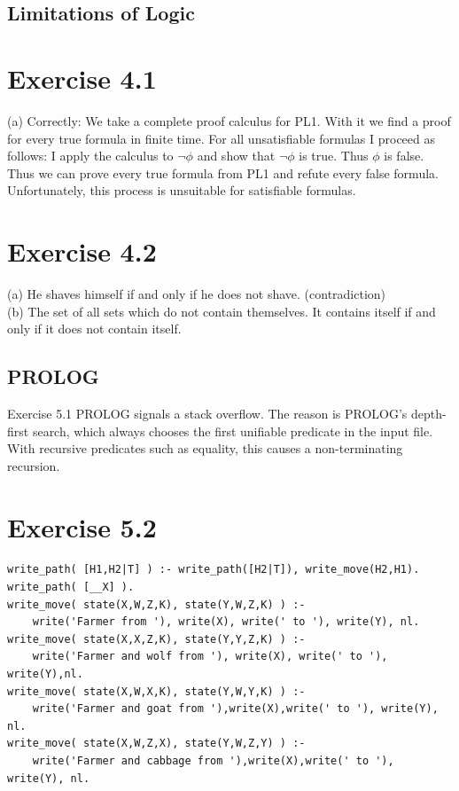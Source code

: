 \documentclass[10pt]{article}
\begin{document}
\subsection*{Limitations of Logic}
\section*{Exercise 4.1}
(a) Correctly: We take a complete proof calculus for PL1. With it we find a proof for every true formula in finite time. For all unsatisfiable formulas I proceed as follows: I apply the calculus to $\neg \phi$ and show that $\neg \phi$ is true. Thus $\phi$ is false. Thus we can prove every true formula from PL1 and refute every false formula. Unfortunately, this process is unsuitable for satisfiable formulas.

\section*{Exercise 4.2}
(a) He shaves himself if and only if he does not shave. (contradiction)\\
(b) The set of all sets which do not contain themselves. It contains itself if and only if it does not contain itself.

\subsection*{PROLOG}
Exercise 5.1 PROLOG signals a stack overflow. The reason is PROLOG's depth-first search, which always chooses the first unifiable predicate in the input file. With recursive predicates such as equality, this causes a non-terminating recursion.

\section*{Exercise 5.2}
\begin{verbatim}
write_path( [H1,H2|T] ) :- write_path([H2|T]), write_move(H2,H1).
write_path( [__X] ).
write_move( state(X,W,Z,K), state(Y,W,Z,K) ) :-
    write('Farmer from '), write(X), write(' to '), write(Y), nl.
write_move( state(X,X,Z,K), state(Y,Y,Z,K) ) :-
    write('Farmer and wolf from '), write(X), write(' to '), write(Y),nl.
write_move( state(X,W,X,K), state(Y,W,Y,K) ) :-
    write('Farmer and goat from '),write(X),write(' to '), write(Y), nl.
write_move( state(X,W,Z,X), state(Y,W,Z,Y) ) :-
    write('Farmer and cabbage from '),write(X),write(' to '), write(Y), nl.
\end{verbatim}
\end{document}
